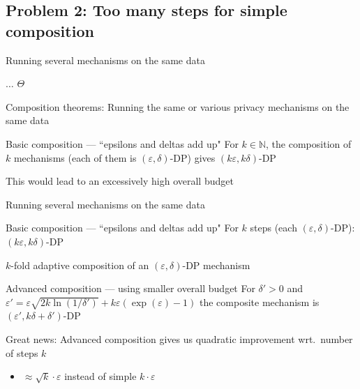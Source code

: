 \documentclass[12pt,aspectratio=169,handout]{beamer}
\begin{document}
\subsection{Problem 2: Too many steps for simple composition}

\begin{frame}{Running several mechanisms on the same data}

\begin{algorithmic}[1]
		\State $\ldots$
	\EndWhile
	\State \Return $\Theta$
	\EndFunction
\end{algorithmic}

Composition theorems: Running the same or various privacy mechanisms on the same data

\begin{block}{Basic composition --- ``epsilons and deltas add up"}
For $k \in \mathbb{N}$, the composition of $k$ mechanisms (each of them is $(\varepsilon, \delta)$-DP) gives $(k \varepsilon, k \delta)$-DP
\end{block}

This would lead to an excessively high overall budget

\end{frame}


\begin{frame}{Running several mechanisms on the same data}

\begin{block}{Basic composition --- ``epsilons and deltas add up"}
For $k$ steps (each $(\varepsilon, \delta)$-DP): $(k \varepsilon, k \delta)$-DP
\end{block}

$k$-fold adaptive composition of an $(\varepsilon, \delta)$-DP mechanism
	
\begin{block}{Advanced composition --- using smaller overall budget}
For $\delta' > 0$ and
$\varepsilon' = \varepsilon \sqrt{2 k \ln( 1 / \delta')} + k \varepsilon ( \exp(\varepsilon) - 1)$
the composite mechanism is $(\varepsilon', k \delta + \delta')$-DP
\end{block}

Great news: Advanced composition gives us quadratic improvement wrt.\ number of steps $k$
\begin{itemize}
\item $\approx \sqrt{k} \cdot \varepsilon$ instead of simple $k \cdot \varepsilon$
\end{itemize}



\end{frame}
\end{document}
